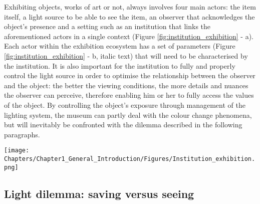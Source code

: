 Exhibiting objects, works of art or not, always involves four main actors: the item itself, a light source to be able to see the item, an observer that acknowledges the object's presence and a setting such as an institution that links the aforementioned actors in a single context (Figure \ref{fig:institution_exhibition} - a). Each actor within the exhibition ecosystem has a set of parameters (Figure \ref{fig:institution_exhibition} - b, italic text) that will need to be characterised by the institution. It is also important for the institution to fully and properly control the light source in order to optimise the relationship between the observer and the object: the better the viewing conditions, the more details and nuances the observer can perceive, therefore enabling him or her to fully access the values of the object. By controlling the object's exposure through management of the lighting system, the museum can partly deal with the colour change phenomena, but will inevitably be  confronted with the  dilemma  described in the following paragraphs.\\

\begin{figure*} %
\centering
\texttt{[image: Chapters/Chapter1\_General\_Introduction/Figures/Institution\_exhibition.png]}
\caption[\hspace{0.3cm}The cultural institution context]{The cultural institution context: Actors involved in the exhibition of objects (a) ; Ecosystem of exhibition event (b).}
\label{fig:institution_exhibition}
\end{figure*}


\subsection{Light dilemma: saving versus seeing}

